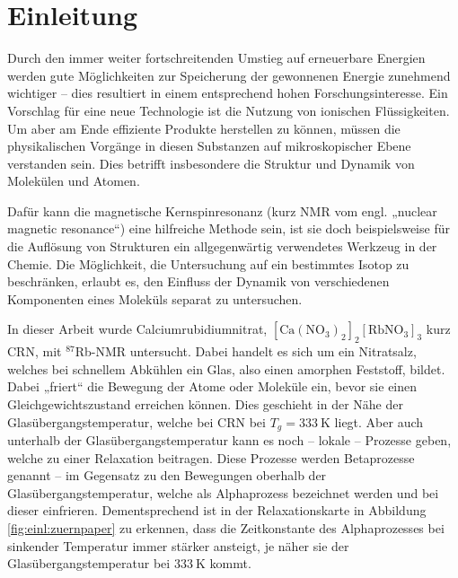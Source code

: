 \chapter{Einleitung}


Durch den immer weiter fortschreitenden Umstieg auf erneuerbare Energien werden gute Möglichkeiten zur Speicherung der gewonnenen Energie zunehmend wichtiger -- dies resultiert in einem entsprechend hohen Forschungsinteresse. Ein Vorschlag für eine neue Technologie ist die Nutzung von ionischen Flüssigkeiten. Um aber am Ende effiziente Produkte herstellen zu können, müssen die physikalischen Vorgänge in diesen Substanzen auf mikroskopischer Ebene verstanden sein. Dies betrifft insbesondere die Struktur und Dynamik von Molekülen und Atomen. 

Dafür kann die magnetische Kernspinresonanz (kurz NMR vom engl. „nuclear magnetic resonance“) eine hilfreiche Methode sein, ist sie doch beispielsweise für die Auflösung von Strukturen ein allgegenwärtig verwendetes Werkzeug in der Chemie. Die Möglichkeit, die Untersuchung auf ein bestimmtes Isotop zu beschränken, erlaubt es, den Einfluss der Dynamik von verschiedenen Komponenten eines Moleküls separat zu untersuchen.

In dieser Arbeit wurde Calciumrubidiumnitrat, $[\text{Ca}(\text{NO}_\text{3})_\text{2}]_\text{2}[\text{RbNO}_\text{3}]_\text{3}$ kurz CRN, mit $^\text{87}$Rb-NMR untersucht. Dabei handelt es sich um ein Nitratsalz, welches bei schnellem Abkühlen ein Glas, also einen amorphen Feststoff, bildet. Dabei „friert“ die Bewegung der Atome oder Moleküle ein, bevor sie einen Gleichgewichtszustand erreichen können. Dies geschieht in der Nähe der Glasübergangstemperatur, welche bei CRN bei $T_g = \SI{333}{\kelvin}$ liegt. Aber auch unterhalb der Glasübergangstemperatur kann es noch -- lokale -- Prozesse geben, welche zu einer Relaxation beitragen. Diese Prozesse werden Betaprozesse genannt -- im Gegensatz zu den Bewegungen oberhalb der Glasübergangstemperatur, welche als Alphaprozess bezeichnet werden und bei dieser einfrieren. Dementsprechend ist in der Relaxationskarte in Abbildung \ref{fig:einl:zuernpaper} zu erkennen, dass die Zeitkonstante des Alphaprozesses bei sinkender Temperatur immer stärker ansteigt, je näher sie der Glasübergangstemperatur bei $\SI{333}{\kelvin}$ kommt.

